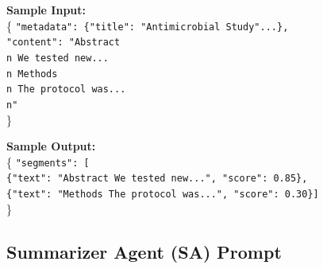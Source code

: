 \documentclass{article}
\begin{document}
\begin{tcolorbox}[colframe=black!25, colback=black!5, boxrule=0.5pt, arc=2pt]
\vspace{1mm}
\noindent
\textbf{Sample Input:}\\
\{
  \texttt{"metadata": \{"title": "Antimicrobial Study"...\},}\\
  \texttt{"content": "Abstract\\n We tested new...\\n Methods\\n The protocol was...\\n"}\\
\}

\vspace{1mm}
\noindent
\textbf{Sample Output:}\\
\{
  \texttt{"segments": [}\\
  \quad \texttt{\{"text": "Abstract We tested new...", "score": 0.85\},}\\
  \quad \texttt{\{"text": "Methods The protocol was...", "score": 0.30\}]}\\
\}
\end{tcolorbox}
\newpage


\subsection{Summarizer Agent (SA) Prompt}
\label{appendix:sa_prompt}
\end{document}
